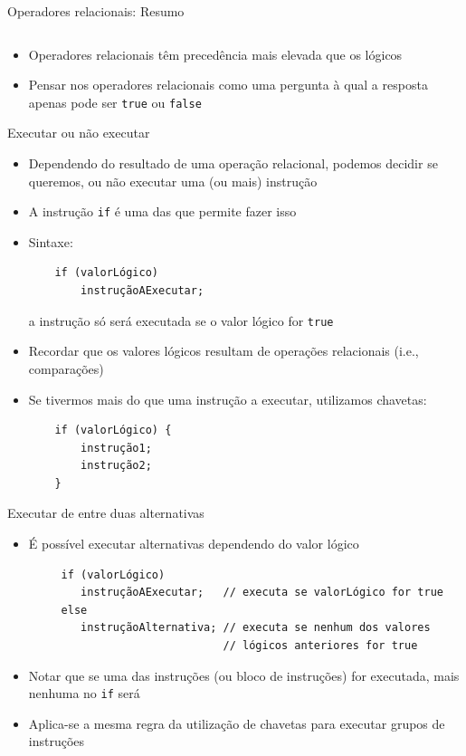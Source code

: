 \documentclass[portuguese, aspectratio=169, xcolor=table]{beamer}
\begin{document}
\begin{frame}{Operadores relacionais: Resumo}
\begin{center}
\begin{tabular}{clrr}
        \end{tabular}
    \end{center}
    \vfill
    \begin{itemize}
        \item Operadores relacionais têm precedência mais elevada que os lógicos
        \item Pensar nos operadores relacionais como uma pergunta à qual a resposta apenas pode ser \texttt{true} ou \texttt{false}
    \end{itemize}
\end{frame}


\begin{frame}[fragile]{Executar ou não executar}
\begin{itemize}
    \item Dependendo do resultado de uma operação relacional, podemos decidir se queremos, ou não executar uma (ou mais) instrução
    \item A instrução \texttt{if} é uma das que permite fazer isso
    \item Sintaxe:
\begin{verbatim}
    if (valorLógico)
        instruçãoAExecutar; 
\end{verbatim}
a instrução só será executada se o valor lógico for \texttt{true}
\item Recordar que os valores lógicos resultam de operações relacionais (i.e., comparações)
\item Se tivermos mais do que uma instrução a executar, utilizamos chavetas:
    \begin{verbatim}
    if (valorLógico) {
        instrução1;
        instrução2;
    }
\end{verbatim}
\end{itemize}
\end{frame}


\begin{frame}[fragile]{Executar de entre duas alternativas}
\begin{itemize}
    \item É possível executar alternativas dependendo do valor lógico
    \begin{verbatim}
     if (valorLógico)
        instruçãoAExecutar;   // executa se valorLógico for true
     else
        instruçãoAlternativa; // executa se nenhum dos valores 
                              // lógicos anteriores for true
    \end{verbatim}
\item Notar que se uma das instruções (ou bloco de instruções) for executada, mais nenhuma no \texttt{if} será
\item Aplica-se a mesma regra da utilização de chavetas para executar grupos de instruções
\end{itemize}
\end{frame}
\end{document}
